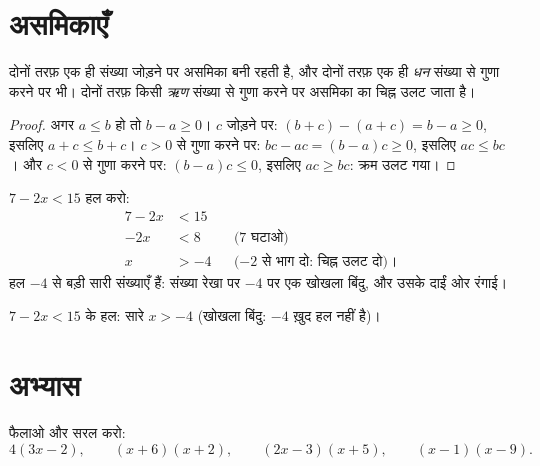 \section{असमिकाएँ}

\begin{proposition}[असमिकाओं के नियम]\label{prop:g9:algebra:ineq}
दोनों तरफ़ एक ही संख्या जोड़ने पर असमिका बनी रहती है, और दोनों तरफ़ एक
ही \emph{धन} संख्या से गुणा करने पर भी। दोनों तरफ़ किसी \emph{ऋण}
संख्या से गुणा करने पर असमिका का चिह्न उलट जाता है।
\end{proposition}

\begin{proof}
अगर $a \leq b$ हो तो $b - a \geq 0$। $c$ जोड़ने पर:
$(b+c) - (a+c) = b - a \geq 0$, इसलिए $a + c \leq b + c$। $c > 0$ से
गुणा करने पर: $bc - ac = (b-a)c \geq 0$, इसलिए $ac \leq bc$। और
$c < 0$ से गुणा करने पर: $(b-a)c \leq 0$, इसलिए $ac \geq bc$: क्रम
उलट गया।
\end{proof}

\begin{example}\label{ex:g9:algebra:ineq}
$7 - 2x < 15$ हल करो:
\begin{align*}
7 - 2x &< 15 \\
-2x &< 8 && \text{($7$ घटाओ)} \\
x &> -4 && \text{($-2$ से भाग दो: चिह्न उलट दो)।}
\end{align*}
हल $-4$ से बड़ी सारी संख्याएँ हैं: संख्या रेखा पर $-4$ पर एक खोखला
बिंदु, और उसके दाईं ओर रंगाई।
\end{example}

\begin{omfigure}

{\small $7 - 2x < 15$ के हल: सारे $x > -4$ (खोखला बिंदु: $-4$ ख़ुद
हल नहीं है)।}
\end{omfigure}

\section{अभ्यास}

\begin{exercise}[$\star$]\label{exo:g9:algebra:1}
फैलाओ और सरल करो:
\[
4(3x - 2), \qquad
(x + 6)(x + 2), \qquad
(2x - 3)(x + 5), \qquad
(x - 1)(x - 9).
\]
\end{exercise}

